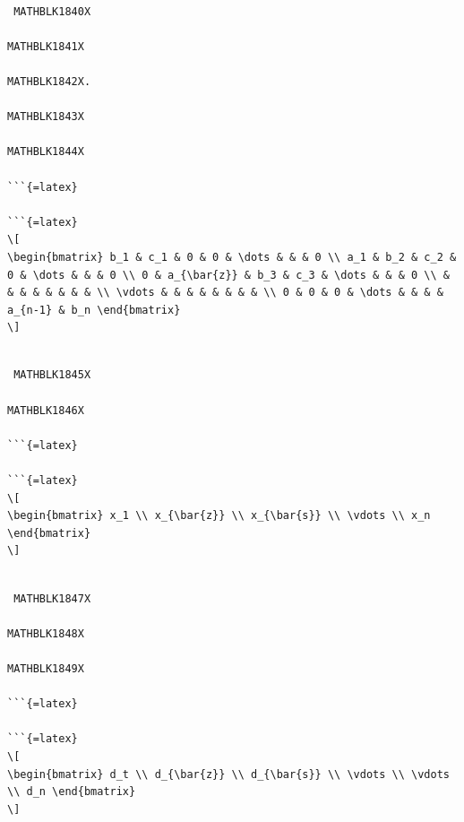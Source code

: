 \documentclass[
  ukrainian,
]{article}
\begin{document}
\begin{verbatim}

 MATHBLK1840X

MATHBLK1841X

MATHBLK1842X.

MATHBLK1843X

MATHBLK1844X

```{=latex}

```{=latex}
\[
\begin{bmatrix} b_1 & c_1 & 0 & 0 & \dots & & & 0 \\ a_1 & b_2 & c_2 & 0 & \dots & & & 0 \\ 0 & a_{\bar{z}} & b_3 & c_3 & \dots & & & 0 \\ & & & & & & & & \\ \vdots & & & & & & & & \\ 0 & 0 & 0 & \dots & & & & a_{n-1} & b_n \end{bmatrix}
\]
\end{verbatim}

\begin{verbatim}

 MATHBLK1845X

MATHBLK1846X

```{=latex}

```{=latex}
\[
\begin{bmatrix} x_1 \\ x_{\bar{z}} \\ x_{\bar{s}} \\ \vdots \\ x_n \end{bmatrix}
\]
\end{verbatim}

\begin{verbatim}

 MATHBLK1847X

MATHBLK1848X

MATHBLK1849X

```{=latex}

```{=latex}
\[
\begin{bmatrix} d_t \\ d_{\bar{z}} \\ d_{\bar{s}} \\ \vdots \\ \vdots \\ d_n \end{bmatrix}
\]
\end{verbatim}
\end{document}
